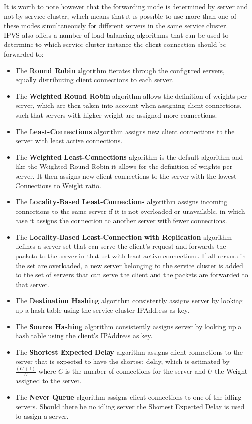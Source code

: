 It is worth to note however that the forwarding mode is determined by server and not by service cluster, which means that it is possible to use more than one of these modes simultaneously for different servers in the same service cluster.\\
%
IPVS also offers a number of load balancing algorithms that can be used to determine to which service cluster instance the client connection should be forwarded to:
%
\begin{itemize}
	\item The \textbf{Round Robin} algorithm iterates through the configured servers, equally distributing client connections to each server.
	\item The \textbf{Weighted Round Robin} algorithm allows the definition of weights per server, which are then taken into account when assigning client connections, such that servers with higher weight are assigned more connections.
	\item The \textbf{Least-Connections} algorithm assigns new client connections to the server with least active connections.
	\item The \textbf{Weighted Least-Connections} algorithm is the default algorithm and like the Weighted Round Robin it allows for the definition of weights per server. It then assigns new client connections to the server with the lowest Connections to Weight ratio.
	\item The \textbf{Locality-Based Least-Connections} algorithm assigns incoming connections to the same server if it is not overloaded or unavailable, in which case it assigns the connection to another server with fewer connections.
	\item The \textbf{Locality-Based Least-Connection with Replication} algorithm defines a server set that can serve the client's request and forwards the packets to the server in that set with least active connections. If all servers in the set are overloaded, a new server belonging to the service cluster is added to the set of servers that can serve the client and the packets are forwarded to that server.
	\item The \textbf{Destination Hashing} algorithm consistently assigns server by looking up a hash table using the service cluster \gls{IPAddress} as key.
	\item The \textbf{Source Hashing} algorithm consistently assigns server by looking up a hash table using the client's \gls{IPAddress} as key.
	\item The \textbf{Shortest Expected Delay} algorithm assigns client connections to the server that is expected to have the shortest delay, which is estimated by $\frac{(C + 1)}{U}$ where $\mathit{C}$ is the number of connections for the server and $\mathit{U}$ the Weight assigned to the server.
	\item The \textbf{Never Queue} algorithm assigns client connections to one of the idling servers. Should there be no idling server the Shortest Expected Delay is used to assign a server.
\end{itemize}
